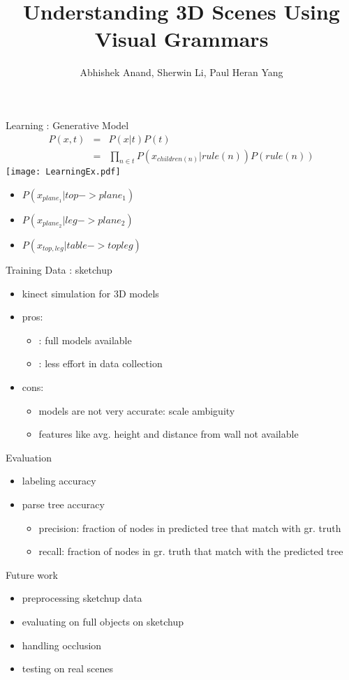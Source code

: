 \documentclass{beamer}
\title{Understanding 3D Scenes Using Visual Grammars}
\author{Abhishek Anand, Sherwin Li, Paul Heran Yang }
\institute{Cornell University}
\begin{document}
\begin{frame}
\titlepage
\end{frame}

\begin{frame}{Learning : Generative Model}
\begin{eqnarray}
P(x,t)&=&P(x|t)P(t) \\
&=& \prod_{n \in t}{P(x_{children(n)} |rule(n) )P(rule(n))}
\end{eqnarray}
               		\texttt{[image: LearningEx.pdf]}
\vskip-1in
		\begin{itemize}
			\item $P(x_{plane_1}| top -> plane_1)$
			\item $P(x_{plane_2}| leg -> plane_2)$
			\item $P(x_{top,leg}| table -> top leg)$
		\end{itemize}


\end{frame}

\begin{frame}{Training Data : sketchup}
\begin{itemize}
\item kinect simulation for 3D models
\item pros:

\begin{itemize}
\item : full models available
\item : less effort in data collection
\end{itemize}
\item cons:
\begin{itemize}
\item models are not very accurate: scale ambiguity
\item features like avg. height and distance from wall not available

\end{itemize}

\end{itemize}

\end{frame}

\begin{frame}{Evaluation}
\begin{itemize}
\item labeling accuracy
\item parse tree accuracy

\begin{itemize}
	\item precision: fraction of nodes in predicted tree that match with gr. truth
	\item recall: fraction of nodes in gr. truth that match with the predicted tree
\end{itemize}
\end{itemize}
\end{frame}

\begin{frame}{Future work}
\begin{itemize}
\item preprocessing sketchup data
\item evaluating on full objects on sketchup
\item handling occlusion
\item testing on real scenes

\end{itemize}
\end{frame}
\end{document}
